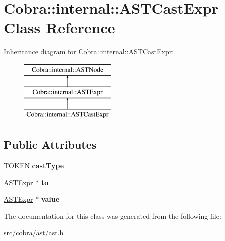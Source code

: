 \hypertarget{class_cobra_1_1internal_1_1_a_s_t_cast_expr}{\section{Cobra\+:\+:internal\+:\+:A\+S\+T\+Cast\+Expr Class Reference}
\label{class_cobra_1_1internal_1_1_a_s_t_cast_expr}
}
Inheritance diagram for Cobra\+:\+:internal\+:\+:A\+S\+T\+Cast\+Expr\+:\begin{figure}[H]
\begin{center}
\leavevmode
\includegraphics[height=3.000000cm]{class_cobra_1_1internal_1_1_a_s_t_cast_expr}
\end{center}
\end{figure}
\subsection*{Public Attributes}
\begin{DoxyCompactItemize}
\item 
\hypertarget{class_cobra_1_1internal_1_1_a_s_t_cast_expr_ae1c831b39b5f0280e17896784dc419fa}{T\+O\+K\+E\+N {\bfseries cast\+Type}}\label{class_cobra_1_1internal_1_1_a_s_t_cast_expr_ae1c831b39b5f0280e17896784dc419fa}

\item 
\hypertarget{class_cobra_1_1internal_1_1_a_s_t_cast_expr_a65dd03166f5fa966c3c9d18fe78a30e3}{\hyperlink{class_cobra_1_1internal_1_1_a_s_t_expr}{A\+S\+T\+Expr} $\ast$ {\bfseries to}}\label{class_cobra_1_1internal_1_1_a_s_t_cast_expr_a65dd03166f5fa966c3c9d18fe78a30e3}

\item 
\hypertarget{class_cobra_1_1internal_1_1_a_s_t_cast_expr_ad3b58a028bdb1241fe1eb98b306fd9cb}{\hyperlink{class_cobra_1_1internal_1_1_a_s_t_expr}{A\+S\+T\+Expr} $\ast$ {\bfseries value}}\label{class_cobra_1_1internal_1_1_a_s_t_cast_expr_ad3b58a028bdb1241fe1eb98b306fd9cb}

\end{DoxyCompactItemize}


The documentation for this class was generated from the following file\+:\begin{DoxyCompactItemize}
\item 
src/cobra/ast/ast.\+h\end{DoxyCompactItemize}
